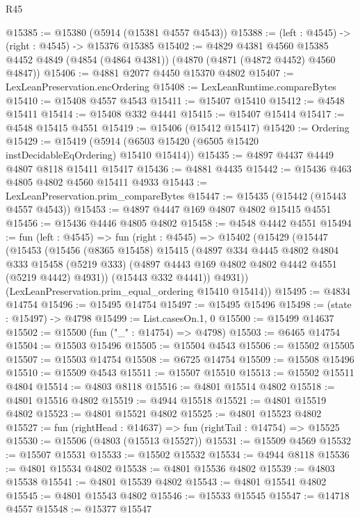 \begin{lexlean}{R45}
\begin{coremodule}
@15385 := @15380 (@5914 (@15381 @4557 @4543))
@15388 := (left : @4545) -> (right : @4545) -> @15376 @15385
@15402 := @4829
    @4381
    @4560
    @15385
    @4452
    @4849
    (@4854 (@4864 @4381))
    (@4870 (@4871 (@4872 @4452) @4560 @4847))
@15406 := @4881 @2077 @4450 @15370 @4802
@15407 := LexLeanPreservation.encOrdering
@15408 := LexLeanRuntime.compareBytes
@15410 := @15408 @4557 @4543
@15411 := @15407 @15410
@15412 := @4548 @15411
@15414 := @15408 @332 @4441
@15415 := @15407 @15414
@15417 := @4548 @15415 @4551
@15419 := @15406 (@15412 @15417)
@15420 := Ordering
@15429 := @15419 (@5914 (@6503 @15420 (@6505 @15420 instDecidableEqOrdering) @15410 @15414))
@15435 := @4897 @4437 @4449 @4807 @8118 @15411 @15417
@15436 := @4881 @4435
@15442 := @15436 @463 @4805 @4802 @4560 @15411 @4933
@15443 := LexLeanPreservation.prim_compareBytes
@15447 := @15435 (@15442 (@15443 @4557 @4543))
@15453 := @4897 @4447 @169 @4807 @4802 @15415 @4551
@15456 := @15436 @4446 @4805 @4802
@15458 := @4548 @4442 @4551
@15494 := fun (left : @4545) =>
  fun (right : @4545) =>
  @15402
    (@15429
      (@15447
        (@15453
          (@15456
            (@8365 @15458)
            @15415
            (@4897
              @334
              @4445
              @4802
              @4804
              @333
              @15458
              (@5219 @333)
              (@4897 @4443 @169 @4802 @4802 @4442 @4551 (@5219 @4442) @4931))
            (@15443 @332 @4441))
          @4931))
      (LexLeanPreservation.prim_equal_ordering @15410 @15414))
@15495 := @4834 @14754
@15496 := @15495 @14754
@15497 := @15495 @15496
@15498 := (state : @15497) -> @4798
@15499 := List.casesOn.{1, 0}
@15500 := @15499 @14637
@15502 := @15500 (fun ("_" : @14754) => @4798)
@15503 := @6465 @14754
@15504 := @15503 @15496
@15505 := @15504 @4543
@15506 := @15502 @15505
@15507 := @15503 @14754
@15508 := @6725 @14754
@15509 := @15508 @15496
@15510 := @15509 @4543
@15511 := @15507 @15510
@15513 := @15502 @15511 @4804
@15514 := @4803 @8118
@15516 := @4801 @15514 @4802
@15518 := @4801 @15516 @4802
@15519 := @4944 @15518
@15521 := @4801 @15519 @4802
@15523 := @4801 @15521 @4802
@15525 := @4801 @15523 @4802
@15527 := fun (rightHead : @14637) => fun (rightTail : @14754) => @15525
@15530 := @15506 (@4803 (@15513 @15527))
@15531 := @15509 @4569
@15532 := @15507 @15531
@15533 := @15502 @15532
@15534 := @4944 @8118
@15536 := @4801 @15534 @4802
@15538 := @4801 @15536 @4802
@15539 := @4803 @15538
@15541 := @4801 @15539 @4802
@15543 := @4801 @15541 @4802
@15545 := @4801 @15543 @4802
@15546 := @15533 @15545
@15547 := @14718 @4557
@15548 := @15377 @15547

\end{coremodule}
\end{lexlean}
